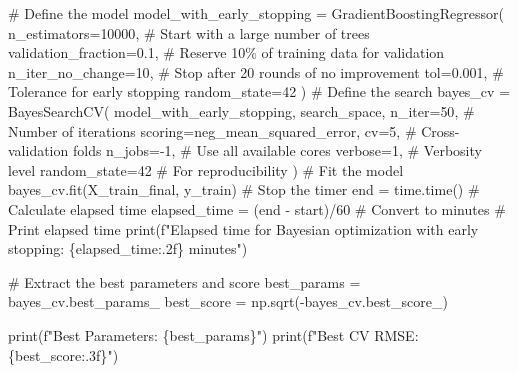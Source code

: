 \documentclass[
  letterpaper,
  DIV=11,
  numbers=noendperiod]{scrreprt}
\newenvironment{Shaded}{\begin{snugshade}}{\end{snugshade}}
\newcommand{\BuiltInTok}[1]{\textcolor[rgb]{0.00,0.23,0.31}{#1}}
\newcommand{\CommentTok}[1]{\textcolor[rgb]{0.37,0.37,0.37}{#1}}
\newcommand{\DecValTok}[1]{\textcolor[rgb]{0.68,0.00,0.00}{#1}}
\newcommand{\FloatTok}[1]{\textcolor[rgb]{0.68,0.00,0.00}{#1}}
\newcommand{\NormalTok}[1]{\textcolor[rgb]{0.00,0.23,0.31}{#1}}
\newcommand{\OperatorTok}[1]{\textcolor[rgb]{0.37,0.37,0.37}{#1}}
\newcommand{\SpecialCharTok}[1]{\textcolor[rgb]{0.37,0.37,0.37}{#1}}
\newcommand{\SpecialStringTok}[1]{\textcolor[rgb]{0.13,0.47,0.30}{#1}}
\newcommand{\StringTok}[1]{\textcolor[rgb]{0.13,0.47,0.30}{#1}}
\begin{document}
\begin{Shaded}
\begin{Highlighting}[]
\CommentTok{\# Define the model}
\NormalTok{model\_with\_early\_stopping }\OperatorTok{=}\NormalTok{ GradientBoostingRegressor(}
\NormalTok{    n\_estimators}\OperatorTok{=}\DecValTok{10000}\NormalTok{,  }\CommentTok{\# Start with a large number of trees}
\NormalTok{    validation\_fraction}\OperatorTok{=}\FloatTok{0.1}\NormalTok{,  }\CommentTok{\# Reserve 10\% of training data for validation}
\NormalTok{    n\_iter\_no\_change}\OperatorTok{=}\DecValTok{10}\NormalTok{,      }\CommentTok{\# Stop after 20 rounds of no improvement}
\NormalTok{    tol}\OperatorTok{=}\FloatTok{0.001}\NormalTok{,           }\CommentTok{\# Tolerance for early stopping}
\NormalTok{    random\_state}\OperatorTok{=}\DecValTok{42}
\NormalTok{)}
\CommentTok{\# Define the search}
\NormalTok{bayes\_cv  }\OperatorTok{=}\NormalTok{ BayesSearchCV(}
\NormalTok{    model\_with\_early\_stopping,}
\NormalTok{    search\_space,}
\NormalTok{    n\_iter}\OperatorTok{=}\DecValTok{50}\NormalTok{,  }\CommentTok{\# Number of iterations}
\NormalTok{    scoring}\OperatorTok{=}\StringTok{\textquotesingle{}neg\_mean\_squared\_error\textquotesingle{}}\NormalTok{,}
\NormalTok{    cv}\OperatorTok{=}\DecValTok{5}\NormalTok{,  }\CommentTok{\# Cross{-}validation folds}
\NormalTok{    n\_jobs}\OperatorTok{={-}}\DecValTok{1}\NormalTok{,  }\CommentTok{\# Use all available cores}
\NormalTok{    verbose}\OperatorTok{=}\DecValTok{1}\NormalTok{,  }\CommentTok{\# Verbosity level}
\NormalTok{    random\_state}\OperatorTok{=}\DecValTok{42}  \CommentTok{\# For reproducibility}
\NormalTok{)}
\CommentTok{\# Fit the model}
\NormalTok{bayes\_cv.fit(X\_train\_final, y\_train)}
\CommentTok{\# Stop the timer}
\NormalTok{end }\OperatorTok{=}\NormalTok{ time.time()}
\CommentTok{\# Calculate elapsed time}
\NormalTok{elapsed\_time }\OperatorTok{=}\NormalTok{ (end }\OperatorTok{{-}}\NormalTok{ start)}\OperatorTok{/}\DecValTok{60}  \CommentTok{\# Convert to minutes}
\CommentTok{\# Print elapsed time}
\BuiltInTok{print}\NormalTok{(}\SpecialStringTok{f"Elapsed time for Bayesian optimization with early stopping: }\SpecialCharTok{\{}\NormalTok{elapsed\_time}\SpecialCharTok{:.2f\}}\SpecialStringTok{ minutes"}\NormalTok{)}

\CommentTok{\# Extract the best parameters and score}
\NormalTok{best\_params }\OperatorTok{=}\NormalTok{ bayes\_cv.best\_params\_}
\NormalTok{best\_score }\OperatorTok{=}\NormalTok{ np.sqrt(}\OperatorTok{{-}}\NormalTok{bayes\_cv.best\_score\_)}

\BuiltInTok{print}\NormalTok{(}\SpecialStringTok{f"Best Parameters: }\SpecialCharTok{\{}\NormalTok{best\_params}\SpecialCharTok{\}}\SpecialStringTok{"}\NormalTok{)}
\BuiltInTok{print}\NormalTok{(}\SpecialStringTok{f"Best CV RMSE: }\SpecialCharTok{\{}\NormalTok{best\_score}\SpecialCharTok{:.3f\}}\SpecialStringTok{"}\NormalTok{)}
\end{Highlighting}
\end{Shaded}
\end{document}
